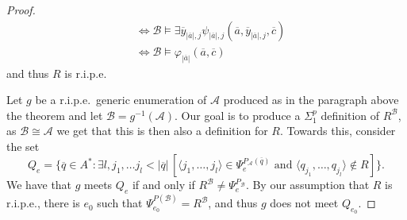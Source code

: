 \documentclass[11pt]{amsart}
\newcommand{\A}{{\mathcal{A}}}
\newcommand{\B}{{\mathcal{B}}}
\renewcommand{\bar}[1]{\overline{#1}}
\renewcommand{\phi}{\varphi}
\begin{document}
\begin{proof}
\begin{align*}
    &\Leftrightarrow \B\models \exists \overline y_{|\overline a|,j}\psi_{|\overline a|,j}(\overline a, \overline y_{|\overline a|,j},\overline c)\\
    &\Leftrightarrow \B\models \phi_{|\overline a|}(\bar a, \bar c)
\end{align*}
and thus $R$ is r.i.p.e.

Let $g$ be a r.i.p.e.\ generic enumeration of $\A$ produced as in the paragraph above the theorem and let $\B=g^{-1}(\A)$. Our goal is to produce a $\Sigma^p_1$ definition of $R^\B$, as $\B\cong \A$ we get that this is then also a definition for $R$. %
%
Towards this, consider the set
\begin{equation*}
    Q_e = \{ \overline{q} \in A^* : \exists l, j_1 ,\dots j_l < |\overline{q}| \, [\langle j_1,\dots, j_l \rangle \in \Psi_e^{P_\A(\overline{q})} \text{ and } \langle q_{j_1},\dots, q_{j_l} \rangle \not \in R] \}.
\end{equation*}
We have that $g$ meets $Q_e$ if and only if $R^\B\neq \Psi_e^{P_\B}$. By our assumption that $R$ is r.i.p.e., there is $e_0$ such that $\Psi^{P(\B)}_{e_0}=R^\B$, and thus $g$ does not meet $Q_{e_0}$.


\end{proof}
\end{document}
